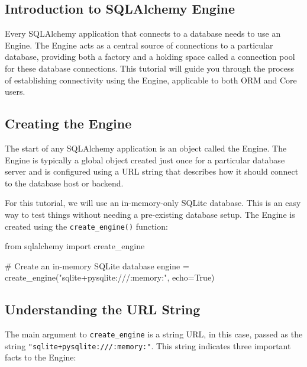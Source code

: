 \documentclass[
  letterpaper,
  DIV=11,
  numbers=noendperiod]{scrreprt}
\newenvironment{Shaded}{\begin{snugshade}}{\end{snugshade}}
\newcommand{\CommentTok}[1]{\textcolor[rgb]{0.37,0.37,0.37}{#1}}
\newcommand{\ImportTok}[1]{\textcolor[rgb]{0.00,0.46,0.62}{#1}}
\newcommand{\NormalTok}[1]{\textcolor[rgb]{0.00,0.23,0.31}{#1}}
\newcommand{\OperatorTok}[1]{\textcolor[rgb]{0.37,0.37,0.37}{#1}}
\newcommand{\StringTok}[1]{\textcolor[rgb]{0.13,0.47,0.30}{#1}}
\newcommand{\VariableTok}[1]{\textcolor[rgb]{0.07,0.07,0.07}{#1}}
\begin{document}
\subsection{Introduction to SQLAlchemy
Engine}\label{introduction-to-sqlalchemy-engine}

Every SQLAlchemy application that connects to a database needs to use an
Engine. The Engine acts as a central source of connections to a
particular database, providing both a factory and a holding space called
a connection pool for these database connections. This tutorial will
guide you through the process of establishing connectivity using the
Engine, applicable to both ORM and Core users.

\subsection{Creating the Engine}\label{creating-the-engine}

The start of any SQLAlchemy application is an object called the Engine.
The Engine is typically a global object created just once for a
particular database server and is configured using a URL string that
describes how it should connect to the database host or backend.

For this tutorial, we will use an in-memory-only SQLite database. This
is an easy way to test things without needing a pre-existing database
setup. The Engine is created using the \texttt{create\_engine()}
function:

\begin{Shaded}
\begin{Highlighting}[]
\ImportTok{from}\NormalTok{ sqlalchemy }\ImportTok{import}\NormalTok{ create\_engine}

\CommentTok{\# Create an in{-}memory SQLite database}
\NormalTok{engine }\OperatorTok{=}\NormalTok{ create\_engine(}\StringTok{"sqlite+pysqlite:///:memory:"}\NormalTok{, echo}\OperatorTok{=}\VariableTok{True}\NormalTok{)}
\end{Highlighting}
\end{Shaded}

\subsection{Understanding the URL
String}\label{understanding-the-url-string}

The main argument to \texttt{create\_engine} is a string URL, in this
case, passed as the string \texttt{"sqlite+pysqlite:///:memory:"}. This
string indicates three important facts to the Engine:
\end{document}
